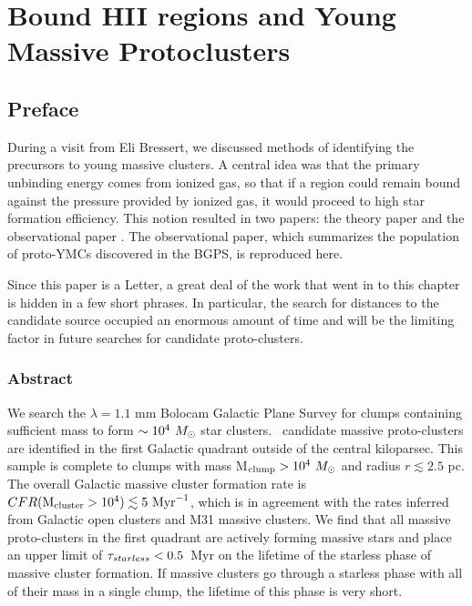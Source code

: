 
%
\chapter{Bound HII regions and Young Massive Protoclusters}
\label{ch:ympc}



\section{Preface}
During a visit from Eli Bressert, we discussed methods of identifying the
precursors to young massive clusters.  A central idea was that the primary
unbinding energy comes from ionized gas, so that if a region could remain
bound against the pressure provided by ionized gas, it would proceed to
high star formation efficiency.  This notion resulted in two papers: the theory
paper \citep{Bressert2012a} and the observational paper \citep{Ginsburg2012a}.
The observational paper, which summarizes the population of proto-YMCs discovered
in the BGPS, is reproduced here.

Since this paper is a Letter, a great deal of the work that went in to this
chapter is hidden in a few short phrases.  In particular, the search for
distances to the candidate source occupied an enormous amount of time and will
be the limiting factor in future searches for candidate proto-clusters.

\subsection{Abstract}
    
We search the $\lambda=1.1$ mm Bolocam Galactic Plane Survey for clumps
containing sufficient mass to form $\sim10^4~M_{\odot}$ star clusters.
\ncandidates\ candidate massive proto-clusters  are identified in the first Galactic quadrant outside
of the central kiloparsec.  This
sample is complete to clumps with mass M$_{\rm clump}>10^4~M_{\odot}$ and radius
$r\lesssim2.5$ pc.  The overall Galactic massive cluster formation rate is
$CFR({\rm M}_{\rm cluster}>10^4) \lesssim 5\  \mathrm{Myr}^{-1}$, which is in
agreement with the rates inferred from Galactic open clusters and M31 massive
clusters.  We find that all massive proto-clusters in the first quadrant are
actively forming massive stars and place an upper limit of
$\tau_{starless}<0.5$~Myr on the lifetime of the starless phase of massive
cluster formation.  If massive clusters go through a starless phase with all 
of their mass in a single clump, the lifetime of this phase is very short.





